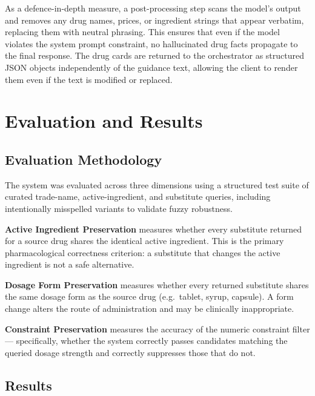 \documentclass[12pt,a4paper]{article}
\begin{document}
As a defence-in-depth measure, a post-processing step scans the model's
output and removes any drug names, prices, or ingredient strings that appear
verbatim, replacing them with neutral phrasing. This ensures that even if
the model violates the system prompt constraint, no hallucinated drug facts
propagate to the final response. The drug cards are returned to the
orchestrator as structured JSON objects independently of the guidance text,
allowing the client to render them even if the text is modified or replaced.

\section{Evaluation and Results}

\subsection{Evaluation Methodology}

The system was evaluated across three dimensions using a structured test suite
of curated trade-name, active-ingredient, and substitute queries, including
intentionally misspelled variants to validate fuzzy robustness.

\textbf{Active Ingredient Preservation} measures whether every substitute
returned for a source drug shares the identical active ingredient. This
is the primary pharmacological correctness criterion: a substitute that
changes the active ingredient is not a safe alternative.

\textbf{Dosage Form Preservation} measures whether every returned substitute
shares the same dosage form as the source drug (e.g.\ tablet, syrup,
capsule). A form change alters the route of administration and may be
clinically inappropriate.

\textbf{Constraint Preservation} measures the accuracy of the numeric
constraint filter --- specifically, whether the system correctly passes
candidates matching the queried dosage strength and correctly suppresses
those that do not.

\subsection{Results}
\end{document}
